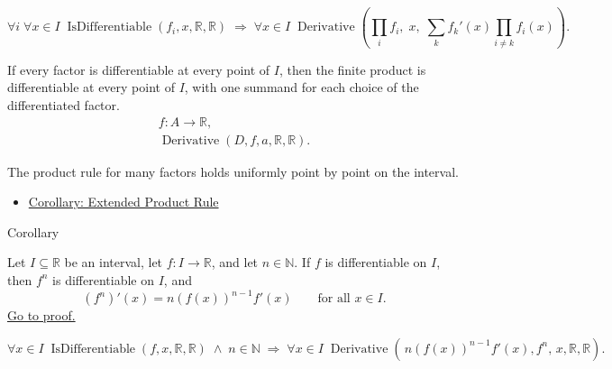 \begin{remark*}
\[
\forall i\;\forall x\in I\;\operatorname{IsDifferentiable}(f_i,x,\mathbb{R},\mathbb{R})
\;\Rightarrow\;
\forall x\in I\;\operatorname{Derivative}\!\left(\textstyle\prod_i f_i,\;x,\;\textstyle\sum_k f_k'(x)\prod_{i\neq k} f_i(x)\right).
\]
\end{remark*}

\begin{remark*}
If every factor is differentiable at every point of $I$, then the finite
product is differentiable at every point of $I$, with one summand for each
choice of the differentiated factor.
\[
\begin{aligned}
  f\colon A\to\mathbb{R},\\
  \operatorname{Derivative}(D,f,a,\mathbb{R},\mathbb{R}).
\end{aligned}
\]
\end{remark*}

\begin{remark*}[Interpretation]
The product rule for many factors holds uniformly point by point on the interval.
\end{remark*}

\begin{dependencies}
\begin{itemize}
  \item \hyperref[cor:extended-product-rule]{Corollary: Extended Product Rule}
\end{itemize}
\end{dependencies}


\begin{corollarybox}{Corollary}
\begin{corollary}
\label{cor:power-rule-special-case-interval}
Let $I \subseteq \mathbb{R}$ be an interval, let $f : I \to \mathbb{R}$, and let $n \in \mathbb{N}$. If $f$ is differentiable on $I$, then $f^n$ is differentiable on $I$, and
\[
(f^n)'(x) = n(f(x))^{n-1}f'(x) \qquad \text{for all } x \in I.
\]
\hyperref[prf:power-rule-special-case-interval]{Go to proof.}
\end{corollary}
\end{corollarybox}

\begin{remark*}
\[
\forall x\in I\;\operatorname{IsDifferentiable}(f,x,\mathbb{R},\mathbb{R}) \;\land\; n\in\mathbb{N}
\;\Rightarrow\;
\forall x\in I\;\operatorname{Derivative}(\,n(f(x))^{n-1}f'(x),f^n,\,x,\mathbb{R},\mathbb{R}).
\]
\end{remark*}

